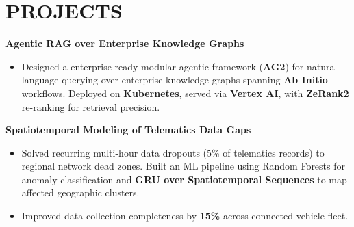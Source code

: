 \documentclass[9pt]{article}
\begin{document}
\vspace{-1pt}

\section*{PROJECTS}
\textbf{Agentic RAG over Enterprise Knowledge Graphs}
\begin{itemize}
    \item Designed a enterprise-ready modular agentic  framework (\textbf{AG2}) for natural-language querying over enterprise knowledge graphs spanning \textbf{Ab Initio} workflows. Deployed on \textbf{Kubernetes}, served via \textbf{Vertex AI}, with \textbf{ZeRank2} re-ranking for retrieval precision.
\end{itemize}
\textbf{Spatiotemporal Modeling of Telematics Data Gaps}
\begin{itemize}
    \item Solved recurring multi-hour data dropouts (5\% of telematics records) to regional network dead zones. Built an ML pipeline using Random Forests for anomaly classification and \textbf{GRU over Spatiotemporal Sequences} to map affected geographic clusters.
    \item Improved data collection completeness by \textbf{15\%} across connected vehicle fleet.
\end{itemize}
\end{document}
